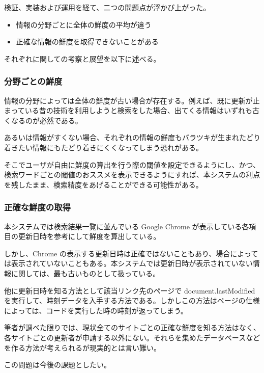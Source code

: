 検証、実装および運用を経て、二つの問題点が浮かび上がった。

\begin{itemize}
  \item 情報の分野ごとに全体の鮮度の平均が違う
  \item 正確な情報の鮮度を取得できないことがある
\end{itemize}

それぞれに関しての考察と展望を以下に述べる。

\subsubsection{分野ごとの鮮度}

情報の分野によっては全体の鮮度が古い場合が存在する。例えば、既に更新が止まっている昔の技術を利用しようと検索をした場合、出てくる情報はいずれも古くなるのが必然である。

あるいは情報がすくない場合、それぞれの情報の鮮度もバラツキが生まれたどり着きたい情報にもたどり着きにくくなってしまう恐れがある。

そこでユーザが自由に鮮度の算出を行う際の閾値を設定できるようにし、かつ、検索ワードごとの閾値のおススメを表示できるようにすれば、本システムの利点を残したまま、検索精度をあげることができる可能性がある。

\subsubsection{正確な鮮度の取得}

本システムでは検索結果一覧に並んでいる Google Chrome が表示している各項目の更新日時を参考にして鮮度を算出している。

しかし、Chrome の表示する更新日時は正確ではないこともあり、場合によっては表示されていないこともある。本システムでは更新日時が表示されていない情報に関しては、最も古いものとして扱っている。

他に更新日時を知る方法として該当リンク先のページで document.lastModified を実行して、時刻データを入手する方法である。しかしこの方法はページの仕様によっては、コードを実行した時の時刻が返ってしまう。

筆者が調べた限りでは、現状全てのサイトごとの正確な鮮度を知る方法はなく、各サイトごとの更新者が申請する以外にない。それらを集めたデータベースなどを作る方法が考えられるが現実的とは言い難い。

この問題は今後の課題としたい。
